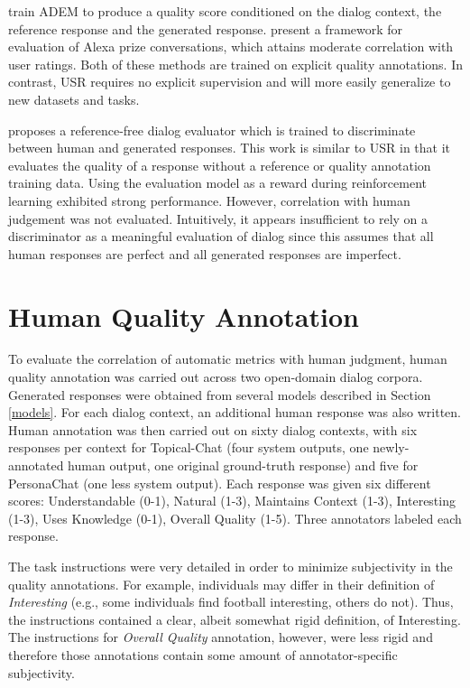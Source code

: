 \documentclass[11pt,a4paper]{article}
\begin{document}
\citet{lowe-etal-2017-towards} train ADEM to produce a quality score conditioned on the dialog context, the reference response and the generated response. \citet{venkatesh2018evaluating} present a framework for evaluation of Alexa prize conversations, which attains moderate correlation with user ratings. Both of these methods are trained on explicit quality annotations. In contrast, USR requires no explicit supervision and will more easily generalize to new datasets and tasks.

\citet{li2017adversarial} proposes a reference-free dialog evaluator which is trained to discriminate between human and generated responses. This work is similar to USR in that it evaluates the quality of a response without a reference or quality annotation training data. Using the evaluation model as a reward during reinforcement learning exhibited strong performance. However, correlation with human judgement was not evaluated. Intuitively, it appears insufficient to rely on a discriminator as a meaningful evaluation of dialog since this assumes that all human responses are perfect and all generated responses are imperfect.

\section{Human Quality Annotation}

To evaluate the correlation of automatic metrics with human judgment, human quality annotation was carried out across two open-domain dialog corpora. Generated responses were obtained from several models described in Section \ref{models}. For each dialog context, an additional human response was also written. Human annotation was then carried out on sixty dialog contexts, with six responses per context for Topical-Chat (four system outputs, one newly-annotated human output, one original ground-truth response) and five for PersonaChat (one less system output). Each response was given six different scores: Understandable (0-1), Natural (1-3), Maintains Context (1-3), Interesting (1-3), Uses Knowledge (0-1), Overall Quality (1-5). Three annotators labeled each response. 

The task instructions were very detailed in order to minimize subjectivity in the quality annotations. For example, individuals may differ in their definition of \textit{Interesting} (e.g., some individuals find football interesting, others do not). Thus, the instructions contained a clear, albeit somewhat rigid definition, of Interesting. The instructions for \textit{Overall Quality} annotation, however, were less rigid and therefore those annotations contain some amount of annotator-specific subjectivity. 
\end{document}
